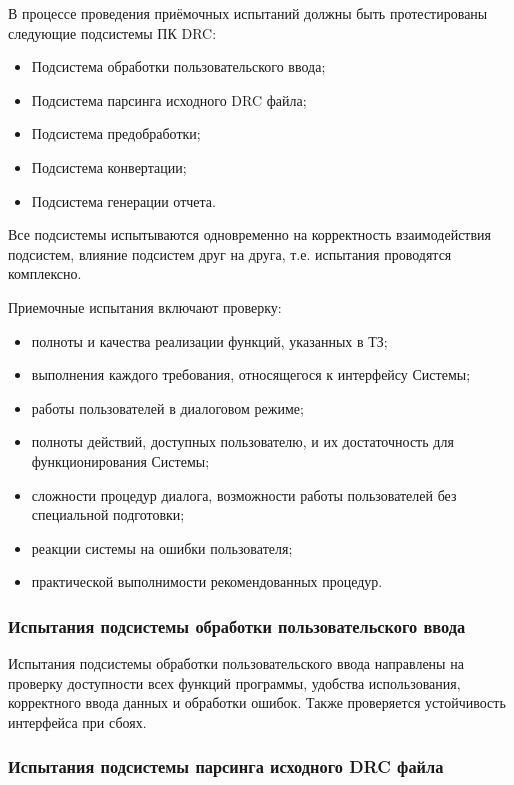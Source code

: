 В процессе проведения приёмочных испытаний должны
быть протестированы следующие подсистемы ПК DRC:

\begin{itemize}
	\item Подсистема обработки пользовательского ввода;
	\item Подсистема парсинга исходного DRC файла;
	\item Подсистема предобработки;
	\item Подсистема конвертации;
	\item Подсистема генерации отчета.
\end{itemize}

Все подсистемы испытываются одновременно
на корректность взаимодействия подсистем,
влияние подсистем друг на друга, т.е. испытания проводятся комплексно.

Приемочные испытания включают проверку:

\begin{itemize}
	\item полноты и качества реализации функций, указанных в ТЗ;
	\item выполнения каждого требования, относящегося к интерфейсу Системы;
	\item работы пользователей в диалоговом режиме;
	\item полноты действий, доступных пользователю,
		и их достаточность для функционирования Системы;
	\item сложности процедур диалога,
		возможности работы пользователей без специальной подготовки;
	\item реакции системы на ошибки пользователя;
	\item практической выполнимости рекомендованных процедур.
\end{itemize}

\subsubsection{Испытания подсистемы обработки пользовательского ввода}

Испытания подсистемы обработки пользовательского ввода
направлены на проверку доступности всех функций программы,
удобства использования, корректного ввода данных и обработки ошибок.
Также проверяется устойчивость интерфейса при сбоях.

\subsubsection{Испытания подсистемы парсинга исходного DRC файла}

